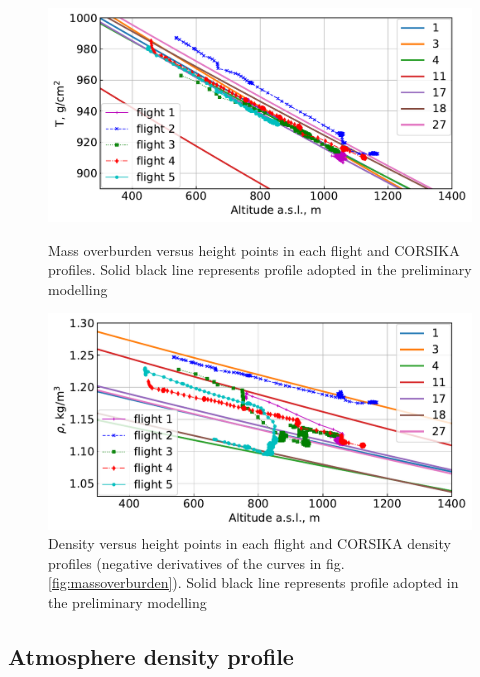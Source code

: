 \documentclass[final,5p,times,twocolumn]{elsarticle}
\begin{document}
\begin{figure}[bt]
\centering
\begin{minipage}[t]{0.48\textwidth}
\includegraphics[width=\textwidth]{figs/atmosphere_T.pdf}
\vspace{-1.0pc}
\caption{Mass overburden versus height points in each flight and CORSIKA profiles. Solid black line represents profile adopted in the preliminary modelling}
\label{fig:massoverburden}
\end{minipage}
\vfill
\vspace{1pc}
\begin{minipage}[t]{0.48\textwidth}
\includegraphics[width=\textwidth]{figs/atmosphere_rho.pdf}
\vspace{-1.0pc}
\caption{Density versus height points in each flight and CORSIKA density profiles (negative derivatives of the curves in fig. \ref{fig:massoverburden}). Solid black line represents profile adopted in the preliminary modelling}
\label{fig:density}
\end{minipage}
\end{figure}

\subsection{Atmosphere density profile\label{sect:atmosphere-profile}}
\end{document}
